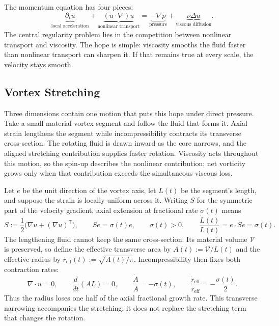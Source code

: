 
The momentum equation has four pieces:
\[
  \underbrace{\partial_t u}_{\text{local acceleration}}
  +
  \underbrace{(u\cdot\nabla)u}_{\text{nonlinear transport}}
  =
  \underbrace{-\nabla p}_{\text{pressure}}
  +
  \underbrace{\nu\Delta u}_{\text{viscous diffusion}}.
\]
The central regularity problem lies in the competition between nonlinear transport and viscosity.
The hope is simple: viscosity smooths the fluid faster than nonlinear transport can sharpen it.
If that remains true at every scale, the velocity stays smooth.

\subsection{Vortex Stretching}\label{sub:ThePerfectlyStretchingVortex}

Three dimensions contain one motion that puts this hope under direct pressure. Take a small material vortex segment and follow the fluid that forms it. Axial strain lengthens the segment while incompressibility contracts its transverse cross-section. The rotating fluid is drawn inward as the core narrows, and the aligned stretching contribution supplies faster rotation. Viscosity acts throughout this motion, so the spin-up describes the nonlinear contribution; net vorticity grows only when that contribution exceeds the simultaneous viscous loss.

Let \(e\) be the unit direction of the vortex axis, let \(L(t)\) be the segment's length, and suppose the strain is locally uniform across it. Writing \(S\) for the symmetric part of the velocity gradient, axial extension at fractional rate \(\sigma(t)\) means
\[
  S:=\frac12\bigl(\nabla u+(\nabla u)^{\mathsf T}\bigr),
  \qquad
  Se=\sigma(t)e,
  \qquad
  \sigma(t)>0,
  \qquad
  \frac{\dot L(t)}{L(t)}
  =
  e\cdot Se
  =
  \sigma(t).
\]
The lengthening fluid cannot keep the same cross-section. Its material volume \(\mathcal V\) is preserved, so define the effective transverse area by \(A(t):=\mathcal V/L(t)\) and the effective radius by \(r_{\mathrm{eff}}(t):=\sqrt{A(t)/\pi}\). Incompressibility then fixes both contraction rates:
\[
  \nabla\cdot u=0,
  \qquad
  \frac{d}{dt}(A L)=0,
  \qquad
  \frac{\dot A}{A}=-\sigma(t),
  \qquad
  \frac{\dot r_{\mathrm{eff}}}{r_{\mathrm{eff}}}
  =
  -\frac{\sigma(t)}{2}.
\]
Thus the radius loses one half of the axial fractional growth rate. This transverse narrowing accompanies the stretching; it does not replace the stretching term that changes the rotation.

